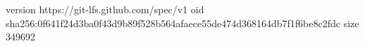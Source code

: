 version https://git-lfs.github.com/spec/v1
oid sha256:0f641f24d3ba0f43d9b89f528b564afaece55de474d368164db7f1f6be8c2fdc
size 349692
